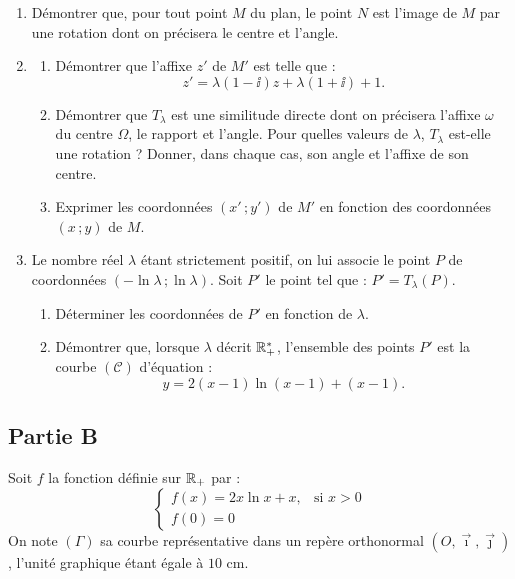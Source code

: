 \begin{enumerate}
	\item Démontrer que, pour tout point $M$ du plan, le point $N$ est l'image de $M$ par
	une rotation dont on précisera le centre et l'angle.

	\item
	\begin{enumerate}
		\item Démontrer que l'affixe $z'$ de $M'$ est telle que :
		\[
		z' = \lambda(1-\ii)z + \lambda(1+\ii) + 1.
		\]
		\item Démontrer que $T_\lambda$ est une similitude directe dont on précisera l'affixe
		$\omega$ du centre $\Omega$, le rapport et l'angle.
		Pour quelles valeurs de $\lambda$, $T_\lambda$ est-elle une rotation ?
		Donner, dans chaque cas, son angle et l'affixe de son centre.
		\item Exprimer les coordonnées $(x'\,;y')$ de $M'$ en fonction des coordonnées $(x\,;y)$ de $M$.
	\end{enumerate}

	\item Le nombre réel $\lambda$ étant strictement positif, on lui associe le point $P$
	de coordonnées $(-\ln\lambda\,;\ln\lambda)$.
	Soit $P'$ le point tel que : $P' = T_\lambda(P)$.
	\begin{enumerate}
		\item Déterminer les coordonnées de $P'$ en fonction de $\lambda$.
		\item Démontrer que, lorsque $\lambda$ décrit $\mathbb{R}_+^*$, l'ensemble des points $P'$
		est la courbe $(\mathscr{C})$ d'équation :
		\[
		y = 2(x-1)\ln(x-1) + (x-1).
		\]
	\end{enumerate}
\end{enumerate}

\subsection*{Partie B}

Soit $f$ la fonction définie sur $\mathbb{R}_+$ par :
\[
\begin{cases}
	f(x) = 2x\ln x + x, & \text{si } x > 0 \\
	f(0) = 0
\end{cases}
\]
On note $(\Gamma)$ sa courbe représentative dans un repère orthonormal $(O,\vec{\imath},\vec{\jmath})$,
l'unité graphique étant égale à $10$ cm.

